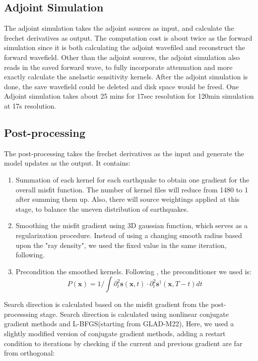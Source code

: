 \documentclass[extra,mreferee]{gji}
\begin{document}
\subsection{Adjoint Simulation}
The adjoint simulation takes the adjoint sources as input, and calculate the frechet
derivatives as output. The computation cost is about twice as the forward simulation since
it is both calculating the adjoint wavefiled and reconstruct the forward wavefield.
Other than the adjoint sources, the adjoint simulation also reads in the saved forward
wave, to fully incorporate attenuation and more exactly calculate the anelastic
sensitivity kernels.
After the adjoint simulation is done, the save wavefield could be deleted and disk
space would be freed.
One Adjoint simulation takes about 25 mins for 17sec resolution for 120min simulation
at 17s resolution.

\subsection{Post-processing}

The post-processing takes the frechet derivatives as the input and generate
the model updates as the output. It contains:
\begin{enumerate}
  \item Summation of each kernel for each earthquake to obtain one
    gradient for the overall misfit function. The number of kernel
    files will reduce from 1480 to 1 after summing them up. Also,
    there will source weightings applied at this stage, to balance
    the uneven distribution of earthquakes.
  \item Smoothing the misfit gradient using 3D gaussian function, which
    serves as a regularization procedure. Instead of using a changing
    smooth radius based upon the "ray density"\citep{bozdaug2016global},
    we used the fixed value in the same iteration, following\cite{hu2012structure}.
  \item Precondition the smoothed kernels. Following
    \citep{luo2013strategies, zhu2012structure, bozdaug2016global},
    the preconditioner we used is:
    \begin{equation}
      P(\mathbf{x}) = 1 / \int \partial_t^2 \mathbf{s}(\mathbf{x}, t) \cdot \partial_t^2 \mathbf{s}^\dagger(\mathbf{x}, T-t) dt
    \end{equation}
\end{enumerate}

Search direction is calculated based on the misfit gradient from the
post-processsing stage. Search direction is calculated using nonlinear conjugate
gradient methods\citep{tape2007finite} and L-BFGS(starting from GLAD-M22),
Here, we used a slightly modified version of conjugate gradient methods,
adding a restart condition\citep{wright1999numerical} to iterations by checking
if the current and previous gradient are far from orthogonal:
\end{document}
